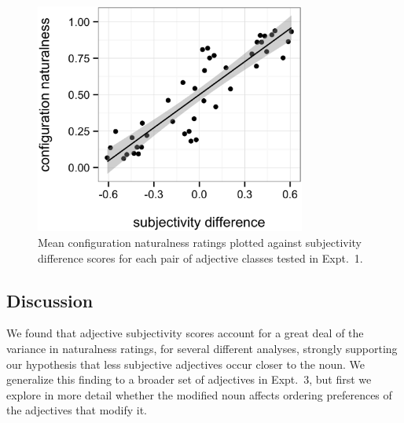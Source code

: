 \documentclass[12pt]{article}
\begin{document}
\begin{figure}
	\centering\includegraphics[width=3.5in]{plots/naturalness-subjectivity-configuration.eps}
	\caption{Mean configuration naturalness ratings plotted against subjectivity difference scores for each pair of adjective classes tested in Expt.~1.}\label{naturalness-subjectivity}
\end{figure}


\subsection{Discussion}

We found that adjective subjectivity scores account for a great deal of the variance in naturalness ratings, for several different analyses, strongly supporting our hypothesis that less subjective adjectives occur closer to the noun. We generalize this finding to a broader set of adjectives in Expt.~3, but first we explore in more detail whether the modified noun affects ordering preferences of the adjectives that modify it.
\end{document}
